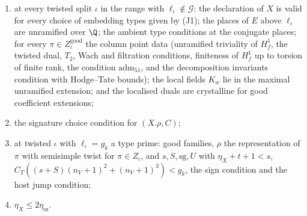 \begin{theorem}
\begin{enumerate}[label=(H\arabic*),leftmargin=*]
$X.\mathrm{exc}$ and every $\pi$ Hodge--Tate bounds for the tame bound condition with $X.c_B(\iota)$;
\item at every twisted split $\iota$ in the range with $\ell_\iota\notin\mathcal G$: the declaration of $X$ is valid for every
choice of embedding types given by (J1); the places of $E$ above $\ell_\iota$ are unramified over $\Q$; the ambient type
conditions at the conjugate places; for every $\pi\in Z^{\mathrm{good}}_\iota$ the column point data (unramified triviality of
$H^1_f$, the twisted dual, $T_2$, Wach and filtration conditions, finiteness of $H^1_f$ up to torsion of finite rank, the condition
$\mathrm{adm}_{51}$, and the decomposition invariants condition with Hodge--Tate bounds); the local fields $K_w$ lie in the maximal
unramified extension; and the localised duals are crystalline for good coefficient extensions;
\item the signature choice condition for $(X.\rho,C)$;
\item at twisted $\iota$ with $\ell_\iota=g_k$ a type prime: good families, $\rho$ the representation of $\pi$ with semisimple
twist for $\pi\in Z_\iota$, and $s,S,\mathrm{sg},U$ with $\eta_X+t+1<s$, $C_T((s+S)(n_V+1)^2+(n_V+1)^3)<g_k$, the sign condition and
the host jump condition;
\item $\eta_X\le2\eta_{\mathrm{sz}}$.
\end{enumerate}
\end{theorem}

